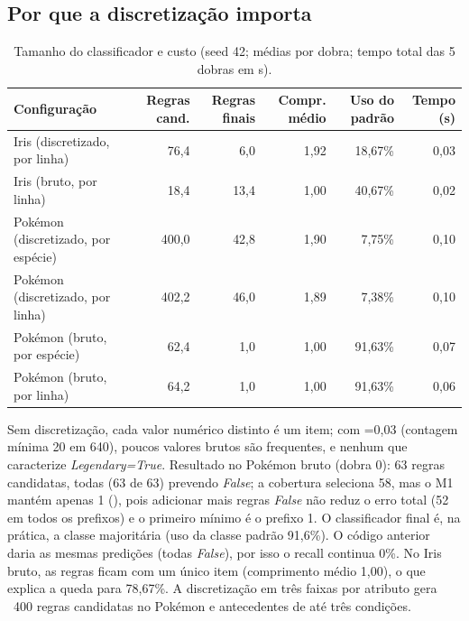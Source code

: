 \documentclass[a4paper,11pt]{article}
\newcommand{\code}[1]{\texttt{\detokenize{#1}}}
\begin{document}
\subsection{Por que a discretiza\c{c}\~ao importa}
\begin{table}[htbp]
\centering
\small
\caption{Tamanho do classificador e custo (seed 42; médias por dobra; tempo total das 5 dobras em s).}
\label{tab:tamanho}
\begin{tabular}{lrrrrr}
\toprule
Configuração & Regras cand. & Regras finais & Compr. médio & Uso do padrão & Tempo (s) \\
\midrule
Iris (discretizado, por linha) & 76,4 & 6,0 & 1,92 & 18,67\% & 0,03 \\
Iris (bruto, por linha) & 18,4 & 13,4 & 1,00 & 40,67\% & 0,02 \\
Pokémon (discretizado, por espécie) & 400,0 & 42,8 & 1,90 & 7,75\% & 0,10 \\
Pokémon (discretizado, por linha) & 402,2 & 46,0 & 1,89 & 7,38\% & 0,10 \\
Pokémon (bruto, por espécie) & 62,4 & 1,0 & 1,00 & 91,63\% & 0,07 \\
Pokémon (bruto, por linha) & 64,2 & 1,0 & 1,00 & 91,63\% & 0,06 \\
\bottomrule
\end{tabular}
\end{table}

Sem discretiza\c{c}\~ao, cada valor num\'erico distinto \'e um item; com \code{min_support}=0,03 (contagem m\'inima 20 em 640), poucos valores brutos s\~ao frequentes, e nenhum que caracterize \emph{Legendary=True}. Resultado no Pok\'emon bruto (dobra 0): 63 regras candidatas, todas (63 de 63) prevendo \emph{False}; a cobertura seleciona 58, mas o M1 mant\'em apenas 1 (\code{HP=60 => Legendary=False}), pois adicionar mais regras \emph{False} n\~ao reduz o erro total (52 em todos os prefixos) e o primeiro m\'inimo \'e o prefixo 1. O classificador final \'e, na pr\'atica, a classe majorit\'aria (uso da classe padr\~ao 91,6\%). O c\'odigo anterior daria as mesmas predi\c{c}\~oes (todas \emph{False}), por isso o recall continua 0\%. No Iris bruto, as regras ficam com um \'unico item (comprimento m\'edio 1,00), o que explica a queda para 78,67\%. A discretiza\c{c}\~ao em três faixas por atributo gera ~400 regras candidatas no Pok\'emon e antecedentes de at\'e três condi\c{c}\~oes.
\end{document}

